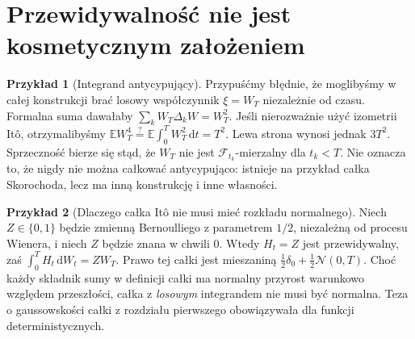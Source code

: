 \documentclass[11pt,a4paper,oneside]{report}
\numberwithin{equation}{chapter}
\theoremstyle{plain}
\theoremstyle{definition}
\newtheorem{przyklad}{Przykład}[chapter]
\theoremstyle{remark}
\newcommand{\E}{\mathbb{E}}
\newcommand{\calF}{\mathcal{F}}
\newcommand{\dd}{\mathrm{d}}
\newcommand{\Normal}{\mathcal{N}}
\begin{document}
\section{Przewidywalność nie jest kosmetycznym założeniem}\label{sec:volIII:02:08}
\begin{przyklad}[Integrand antycypujący]
Przypuśćmy błędnie, że moglibyśmy w całej konstrukcji
brać losowy współczynnik $\xi=W_T$ niezależnie od
czasu. Formalna suma dawałaby
$\sum_kW_T\Delta_kW=W_T^2$.
Jeśli nierozważnie użyć izometrii Itô, otrzymalibyśmy
$\E W_T^4\overset{?}=\E\int_0^TW_T^2\,\dd t=T^2$.
Lewa strona wynosi jednak $3T^2$.
Sprzeczność bierze się stąd, że $W_T$ nie jest
$\calF_{t_k}$-mierzalny dla $t_k<T$.
Nie oznacza to, że nigdy nie można całkować
antycypująco: istnieje na przykład całka Skorochoda,
lecz ma inną konstrukcję i inne własności.
\end{przyklad}

\begin{przyklad}[Dlaczego całka Itô nie musi mieć rozkładu normalnego]
Niech $Z\in\{0,1\}$ będzie zmienną Bernoulliego
z parametrem $1/2$, niezależną od procesu Wienera,
i niech $Z$ będzie znana w chwili $0$.
Wtedy $H_t=Z$ jest przewidywalny, zaś
$\int_0^TH_t\,\dd W_t=ZW_T$.
Prawo tej całki jest mieszaniną
$\frac12\delta_0+\frac12\Normal(0,T)$.
Choć każdy składnik sumy w definicji całki ma
normalny przyrost warunkowo względem przeszłości,
całka z \emph{losowym} integrandem nie musi być
normalna. Teza o gaussowskości całki z rozdziału
pierwszego obowiązywała dla funkcji deterministycznych.
\end{przyklad}


\end{document}
